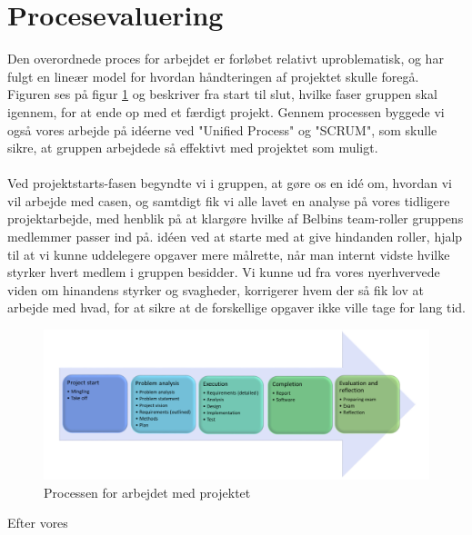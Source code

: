 \clearpage
\section{Procesevaluering}
Den overordnede proces for arbejdet er forløbet relativt uproblematisk, og har fulgt en lineær model for hvordan håndteringen af projektet skulle foregå. Figuren ses på figur \ref{fig:processen} og beskriver fra start til slut, hvilke faser gruppen skal igennem, for at ende op med et færdigt projekt. Gennem processen byggede vi også vores arbejde på idéerne ved "Unified Process" og "SCRUM", som skulle sikre, at gruppen arbejdede så effektivt med projektet som muligt.\\\\
Ved projektstarts-fasen begyndte vi i gruppen, at gøre os en idé om, hvordan vi vil arbejde med casen, og samtdigt fik vi alle lavet en analyse på vores tidligere projektarbejde, med henblik på at klargøre hvilke af Belbins team-roller gruppens medlemmer passer ind på. idéen ved at starte med at give hindanden roller, hjalp til at vi kunne uddelegere opgaver mere målrette, når man internt vidste hvilke styrker hvert medlem i gruppen besidder. Vi kunne ud fra vores nyerhvervede viden om hinandens styrker og svagheder, korrigerer hvem der så fik lov at arbejde med hvad, for at sikre at de forskellige opgaver ikke ville tage for lang tid. 
\begin{figure}[H]
    \centering
    \includegraphics[width=1\textwidth]{images/processen.png}
    \caption{Processen for arbejdet med projektet}
    \label{fig:processen}
\end{figure}
Efter vores 